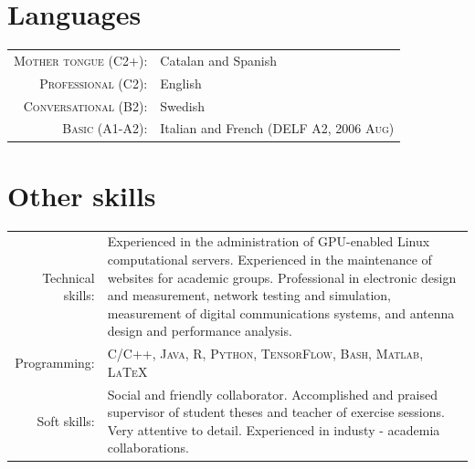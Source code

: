 \documentclass[a4paper,10pt]{article}
\begin{document}
  \section{Languages}

    \begin{tabular}{rp{10cm}}
      
      \textsc{Mother tongue (C2+):} & Catalan and Spanish \\
      
      \textsc{Professional (C2):} & English \\
      
      \textsc{Conversational (B2):} & Swedish \\
      
      \textsc{Basic (A1-A2):} & Italian and French (\textsc{DELF} A2, \textsc{2006 Aug})
      
    \end{tabular}


  \vspace{-15pt}
  
  \section{Other skills}

  \begin{tabular}{rp{12cm}}
	Technical skills:  & Experienced in the administration of GPU-enabled Linux computational servers.
						 Experienced in the maintenance of websites for academic groups.
						 Professional in electronic design and measurement, network testing and 
						 simulation, measurement of digital communications systems, and antenna design
						 and performance analysis. \vspace{5pt}\\ 
	Programming:       &  \textsc{C/C++, Java, R, Python, TensorFlow, Bash, Matlab, \LaTeX}  \vspace{5pt}\\ 
	Soft skills: 	   & Social and friendly collaborator. Accomplished and praised supervisor of 
						 student theses and teacher of exercise sessions. Very attentive to 
						 detail. Experienced in industy - academia collaborations.

  \end{tabular}
\end{document}
